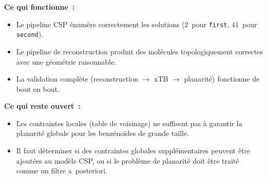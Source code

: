 \documentclass[12pt,a4paper]{article}
\theoremstyle{definition}
\theoremstyle{remark}
\begin{document}
\begin{notebox}[Bilan]
\textbf{Ce qui fonctionne~:}
\begin{itemize}[nosep]
  \item Le pipeline CSP \'enum\`ere correctement les solutions
        (2~pour \texttt{first}, 41~pour \texttt{second}).
  \item Le pipeline de reconstruction produit des mol\'ecules
        topologiquement correctes avec une g\'eom\'etrie raisonnable.
  \item La validation compl\`ete (reconstruction $\to$ xTB $\to$
        planarit\'e) fonctionne de bout en bout.
\end{itemize}

\textbf{Ce qui reste ouvert~:}
\begin{itemize}[nosep]
  \item Les contraintes locales (table de voisinage) ne suffisent pas
        \`a garantir la planarit\'e globale pour les benz\'eno\"ides de
        grande taille.
  \item Il faut d\'eterminer si des contraintes globales suppl\'ementaires
        peuvent \^etre ajout\'ees au mod\`ele CSP, ou si le probl\`eme
        de planarit\'e doit \^etre trait\'e comme un filtre
        a~posteriori.
\end{itemize}
\end{notebox}
\end{document}
